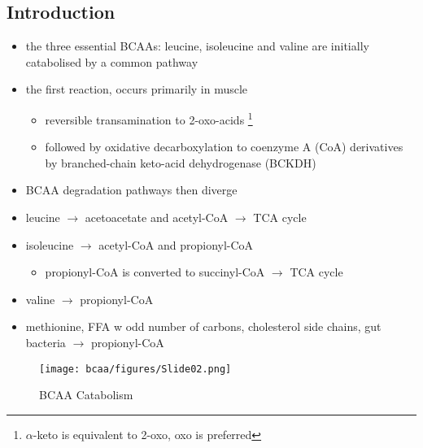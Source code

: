 \documentclass[12pt]{scrartcl}
\begin{document}
\subsection{Introduction}
\label{sec:org3a8086c}
\begin{itemize}
\item the three essential BCAAs: leucine, isoleucine and valine are
initially catabolised by a common pathway
\end{itemize}

\begin{center}
\chemnameinit{}
\hspace{20}
\chemnameinit{}
\hspace{20}
\chemnameinit{}
\end{center}

\begin{itemize}
\item the first reaction, occurs primarily in muscle
\begin{itemize}
\item reversible transamination to 2-oxo-acids \footnote{\(\alpha\)-keto is equivalent to 2-oxo, oxo is preferred}
\item followed by oxidative decarboxylation to coenzyme A (CoA)
derivatives by branched-chain keto-acid dehydrogenase
(BCKDH)
\end{itemize}
\item BCAA degradation pathways then diverge
\item leucine \(\to\) acetoacetate and acetyl-CoA \(\to\) TCA cycle
\item isoleucine \(\to\) acetyl-CoA and propionyl-CoA
\begin{itemize}
\item propionyl-CoA is converted to succinyl-CoA \(\to\) TCA cycle
\end{itemize}
\item valine \(\to\) propionyl-CoA
\item methionine, FFA w odd number of carbons, cholesterol side chains,
gut bacteria \(\to\) propionyl-CoA
\end{itemize}

\begin{figure}[htbp]
\centering
\texttt{[image: bcaa/figures/Slide02.png]}
\caption{\label{fig:orge25c880}BCAA Catabolism}
\end{figure}
\end{document}
